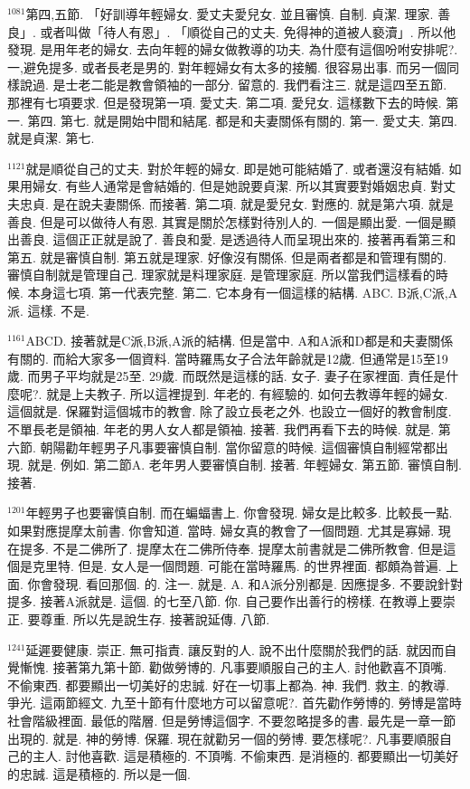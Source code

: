 \documentclass{book}
\begin{document}
$^{1081}$第四,五節.
「好訓導年輕婦女.
愛丈夫愛兒女.
並且審慎.
自制.
貞潔.
理家.
善良」.
或者叫做「待人有恩」.
「順從自己的丈夫.
免得神的道被人褻瀆」.
所以他發現.
是用年老的婦女.
去向年輕的婦女做教導的功夫.
為什麼有這個吩咐安排呢?.
一,避免提多.
或者長老是男的.
對年輕婦女有太多的接觸.
很容易出事.
而另一個同樣說過.
是士老二能是教會領袖的一部分.
留意的.
我們看注三.
就是這四至五節.
那裡有七項要求.
但是發現第一項.
愛丈夫.
第二項.
愛兒女.
這樣數下去的時候.
第一.
第四.
第七.
就是開始中間和結尾.
都是和夫妻關係有關的.
第一.
愛丈夫.
第四.
就是貞潔.
第七.

$^{1121}$就是順從自己的丈夫.
對於年輕的婦女.
即是她可能結婚了.
或者還沒有結婚.
如果用婦女.
有些人通常是會結婚的.
但是她說要貞潔.
所以其實要對婚姻忠貞.
對丈夫忠貞.
是在說夫妻關係.
而接著.
第二項.
就是愛兒女.
對應的.
就是第六項.
就是善良.
但是可以做待人有恩.
其實是關於怎樣對待別人的.
一個是顯出愛.
一個是顯出善良.
這個正正就是說了.
善良和愛.
是透過待人而呈現出來的.
接著再看第三和第五.
就是審慎自制.
第五就是理家.
好像沒有關係.
但是兩者都是和管理有關的.
審慎自制就是管理自己.
理家就是料理家庭.
是管理家庭.
所以當我們這樣看的時候.
本身這七項.
第一代表完整.
第二.
它本身有一個這樣的結構.
ABC.
B派,C派,A派.
這樣.
不是.

$^{1161}$ABCD.
接著就是C派,B派,A派的結構.
但是當中.
A和A派和D都是和夫妻關係有關的.
而給大家多一個資料.
當時羅馬女子合法年齡就是12歲.
但通常是15至19歲.
而男子平均就是25至.
29歲.
而既然是這樣的話.
女子.
妻子在家裡面.
責任是什麼呢?.
就是上夫教子.
所以這裡提到.
年老的.
有經驗的.
如何去教導年輕的婦女.
這個就是.
保羅對這個城市的教會.
除了設立長老之外.
也設立一個好的教會制度.
不單長老是領袖.
年老的男人女人都是領袖.
接著.
我們再看下去的時候.
就是.
第六節.
朝陽勸年輕男子凡事要審慎自制.
當你留意的時候.
這個審慎自制經常都出現.
就是.
例如.
第二節A.
老年男人要審慎自制.
接著.
年輕婦女.
第五節.
審慎自制.
接著.

$^{1201}$年輕男子也要審慎自制.
而在蝙蝠書上.
你會發現.
婦女是比較多.
比較長一點.
如果對應提摩太前書.
你會知道.
當時.
婦女真的教會了一個問題.
尤其是寡婦.
現在提多.
不是二佛所了.
提摩太在二佛所侍奉.
提摩太前書就是二佛所教會.
但是這個是克里特.
但是.
女人是一個問題.
可能在當時羅馬.
的世界裡面.
都頗為普遍.
上面.
你會發現.
看回那個.
的.
注一.
就是.
A.
和A派分別都是.
因應提多.
不要說針對提多.
接著A派就是.
這個.
的七至八節.
你.
自己要作出善行的榜樣.
在教導上要崇正.
要尊重.
所以先是說生存.
接著說延傳.
八節.

$^{1241}$延遲要健康.
崇正.
無可指責.
讓反對的人.
說不出什麼關於我們的話.
就因而自覺慚愧.
接著第九第十節.
勸做勞博的.
凡事要順服自己的主人.
討他歡喜不頂嘴.
不偷東西.
都要顯出一切美好的忠誠.
好在一切事上都為.
神.
我們.
救主.
的教導.
爭光.
這兩節經文.
九至十節有什麼地方可以留意呢?.
首先勸作勞博的.
勞博是當時社會階級裡面.
最低的階層.
但是勞博這個字.
不要忽略提多的書.
最先是一章一節出現的.
就是.
神的勞博.
保羅.
現在就勸另一個的勞博.
要怎樣呢?.
凡事要順服自己的主人.
討他喜歡.
這是積極的.
不頂嘴.
不偷東西.
是消極的.
都要顯出一切美好的忠誠.
這是積極的.
所以是一個.
\end{document}
